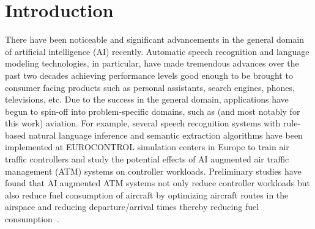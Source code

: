 \documentclass[12pt]{article}
\begin{document}
\section{Introduction}\label{sec:introduction}
There have been noticeable and significant advancements in the general domain of artificial intelligence (AI) recently. Automatic speech recognition and
language modeling technologies, in particular, have made tremendous advances over the past two decades achieving performance levels good enough to
be brought to consumer facing products such as personal assistants, search engines, phones, televisions, etc. Due to the success in the general
domain, applications have begun to spin-off into problem-specific domains, such as (and most notably for this work) aviation. For example, several
speech recognition systems with rule-based natural language inference and semantic extraction algorithms have been implemented at EUROCONTROL
simulation centers in Europe to train air traffic controllers and study the potential effects of AI augmented air traffic management (ATM) systems
on controller workloads. Preliminary studies have found that AI augmented ATM systems not only reduce controller workloads but also reduce fuel
consumption of aircraft by optimizing aircraft routes in the airspace and reducing departure/arrival times thereby reducing fuel
consumption~\cite{helmke_quantifying_2017}.
\end{document}
